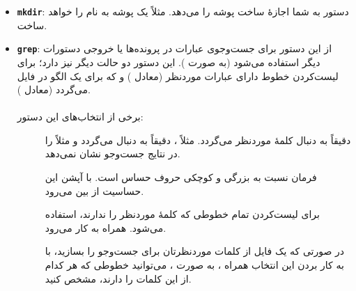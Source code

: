 \begin{itemize}
\item \textbf{\texttt{\Large mkdir}}: دستور  به شما اجازهٔ ساخت پوشه را می‌دهد. مثلاً  یک پوشه به نام  را خواهد ساخت.

\item \textbf{\texttt{\Large grep}}: از این دستور برای جست‌وجوی عبارات در پرونده‌ها یا خروجی دستورات دیگر استفاده می‌شود (به صورت ). این دستور دو حالت دیگر نیز دارد؛  برای لیست‌کردن خطوط دارای عبارات موردنظر (معادل ) و  که برای یک الگو در فایل می‌گردد (معادل ).\\\\
برخی از انتخاب‌های این دستور:
\begin{description}
\item[] دقیقاً به دنبال کلمهٔ موردنظر می‌گردد. مثلاً ، دقیقاً به دنبال  می‌گردد و مثلاً  را در نتایج جست‌وجو نشان نمی‌دهد.

\item[] فرمان  نسبت به بزرگی و کوچکی حروف حساس است. با آپشن  این حساسیت از بین می‌رود.

\item[] برای لیست‌کردن تمام خطوطی که کلمهٔ موردنظر را ندارند، استفاده می‌شود. همراه  به کار می‌رود.

\item[] در صورتی که یک فایل از کلمات موردنظرتان برای جست‌وجو را بسازید، با به کار بردن این انتخاب همراه ، به صورت ، می‌توانید خطوطی که هر کدام از این کلمات را دارند، مشخص کنید.
\end{description}
\end{itemize}

